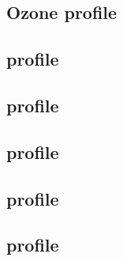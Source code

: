 \subsection{Ozone profile}
\subsection{ profile}
\subsection{ profile}
\subsection{ profile} 
\subsection{ profile}
\subsection{ profile}


